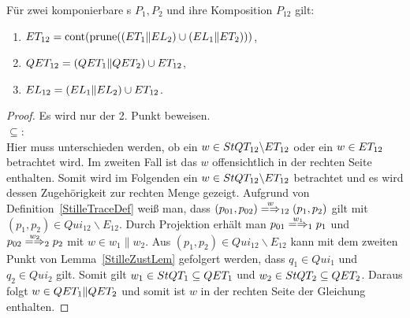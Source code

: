 \begin{Satz}
  \label{StilleSemSatz}
  Für zwei komponierbare \MEIO{}s $P_1,P_2$ und ihre Komposition $P_{12}$ gilt:
  \begin{enumerate}
    \item $ET _{12}=\mathrm{cont} (\mathrm{prune} ((ET _1\|EL _2)\cup (EL _1\|ET _2)))$,
    \item $QET _{12}=(QET _1\|QET _2)\cup ET _{12}$,
    \item $EL _{12}=(EL _1\|EL _2)\cup ET _{12}$.
  \end{enumerate}
\end{Satz}
\begin{proof}
  Es wird nur der 2. Punkt beweisen.\\
  \glqq$\subseteq$\grqq{}:\\
  Hier muss unterschieden werden, ob ein $w\in StQT _{12}\backslash ET _{12}$
  oder ein $w\in ET _{12}$ betrachtet wird. Im zweiten Fall ist das $w$
  offensichtlich in der rechten Seite enthalten. Somit wird im Folgenden ein
  $w\in StQT _{12}\backslash ET _{12}$ betrachtet und es wird dessen
  Zugehörigkeit zur rechten Menge gezeigt. Aufgrund von
  Definition~\ref{StilleTraceDef} weiß man, dass $(p_{01},p_{02})
  \weakmay[w]_{12} (p_1,p_2)$ gilt mit $(p_1,p_2)\in Qui_{12} \backslash
  E_{12}$. Durch Projektion erhält man $p_{01} \weakmay[w_1]_1 p_1$ und $p_{02}
  \weakmay[w_2]_2p_2$ mit $w\in w_1\|w_2$. Aus $(p_1,p_2)\in Qui_{12}
  \backslash E_{12}$ kann mit dem zweiten Punkt von Lemma~\ref{StilleZustLem}
  gefolgert werden, dass $q_1\in Qui_1$ und $q_2\in Qui_2$ gilt. Somit gilt
  $w_1 \in StQT _1\subseteq QET _1$ und $w_2\in StQT _2\subseteq QET _2$.
  Daraus folgt $w\in QET _1\|QET _2$ und somit ist $w$ in der rechten Seite
  der Gleichung enthalten.


\end{proof}

